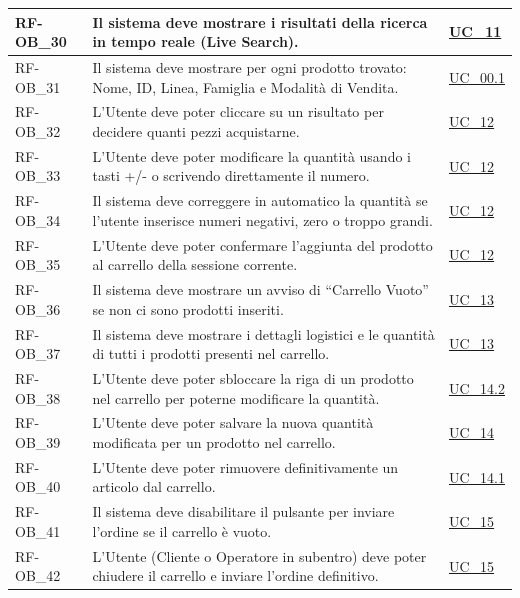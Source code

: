\begin{longtable}{|>{\raggedright}p{}|>{\raggedright\arraybackslash}p{}|>{\raggedright\arraybackslash}p{}|}
    \hline
    RF-OB\_30 \hypertarget{rf-ob_30} & Il sistema deve mostrare i risultati della ricerca in tempo reale (Live Search). & \hyperref[uc_11]{UC\_11} \\
    \hline
    RF-OB\_31 \hypertarget{rf-ob_31} & Il sistema deve mostrare per ogni prodotto trovato: Nome, ID, Linea, Famiglia e Modalità di Vendita. & \hyperref[uc_00.1]{UC\_00.1} \\
    \hline
    RF-OB\_32 \hypertarget{rf-ob_32} & L'Utente deve poter cliccare su un risultato per decidere quanti pezzi acquistarne. & \hyperref[uc_12]{UC\_12} \\
    \hline
    RF-OB\_33 \hypertarget{rf-ob_33} & L'Utente deve poter modificare la quantità usando i tasti +/- o scrivendo direttamente il numero. & \hyperref[uc_12]{UC\_12} \\
    \hline
    RF-OB\_34 \hypertarget{rf-ob_34} & Il sistema deve correggere in automatico la quantità se l'utente inserisce numeri negativi, zero o troppo grandi. & \hyperref[uc_12]{UC\_12} \\
    \hline
    RF-OB\_35 \hypertarget{rf-ob_35} & L'Utente deve poter confermare l'aggiunta del prodotto al carrello della sessione corrente. & \hyperref[uc_12]{UC\_12} \\
    \hline
    RF-OB\_36 \hypertarget{rf-ob_36} & Il sistema deve mostrare un avviso di ``Carrello Vuoto'' se non ci sono prodotti inseriti. & \hyperref[uc_13]{UC\_13} \\
    \hline
    RF-OB\_37 \hypertarget{rf-ob_37} & Il sistema deve mostrare i dettagli logistici e le quantità di tutti i prodotti presenti nel carrello. & \hyperref[uc_13]{UC\_13} \\
    \hline
    RF-OB\_38 \hypertarget{rf-ob_38} & L'Utente deve poter sbloccare la riga di un prodotto nel carrello per poterne modificare la quantità. & \hyperref[uc_14.2]{UC\_14.2} \\
    \hline
    RF-OB\_39 \hypertarget{rf-ob_39} & L'Utente deve poter salvare la nuova quantità modificata per un prodotto nel carrello. & \hyperref[uc_14]{UC\_14} \\
    \hline
    RF-OB\_40 \hypertarget{rf-ob_40} & L'Utente deve poter rimuovere definitivamente un articolo dal carrello. & \hyperref[uc_14.1]{UC\_14.1} \\
    \hline
    RF-OB\_41 \hypertarget{rf-ob_41} & Il sistema deve disabilitare il pulsante per inviare l'ordine se il carrello è vuoto. & \hyperref[uc_15]{UC\_15} \\
    \hline
    RF-OB\_42 \hypertarget{rf-ob_42} & L'Utente (Cliente o Operatore in subentro) deve poter chiudere il carrello e inviare l'ordine definitivo. & \hyperref[uc_15]{UC\_15} \\

\end{longtable}
